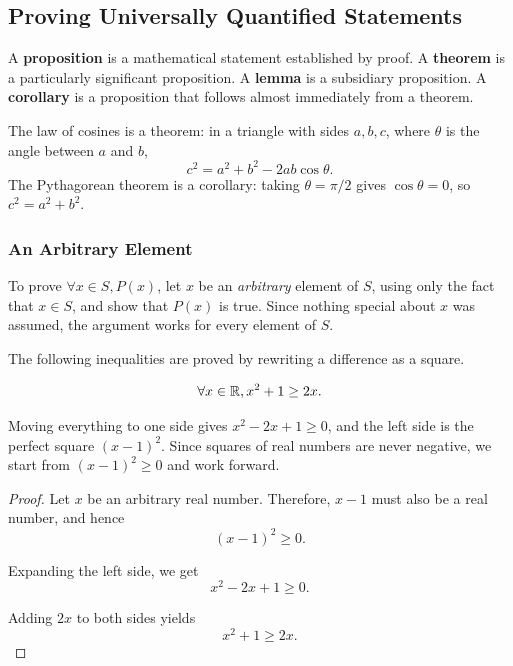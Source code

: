 \subsection{Proving Universally Quantified Statements}
A \textbf{proposition} is a mathematical statement established by proof. A \textbf{theorem}
is a particularly significant proposition. A \textbf{lemma} is a subsidiary proposition.
A \textbf{corollary} is a proposition that follows almost immediately from a theorem.

\begin{example}
    The law of cosines is a theorem: in a triangle with sides $a, b, c$, where $\theta$ is the angle between
    $a$ and $b$,
    \begin{equation*}
        c^2 = a^2 + b^2 - 2ab\cos \theta.
    \end{equation*}
    The Pythagorean theorem is a corollary: taking $\theta = \pi/2$ gives $\cos\theta = 0$, so $c^2 = a^2 + b^2$.
\end{example}

\subsubsection{An Arbitrary Element}
To prove $\forall x \in S, P(x)$, let $x$ be an \emph{arbitrary} element of $S$, using only the fact that
$x \in S$, and show that $P(x)$ is true. Since nothing special about $x$ was assumed, the argument
works for every element of $S$.

The following inequalities are proved by rewriting a difference as a square.
\begin{proposition}
    \begin{equation*}
        \forall x \in \mathbb{R}, x^2 + 1 \geq 2x.
    \end{equation*}
\end{proposition}
\begin{remark}
    Moving everything to one side gives $x^2 - 2x + 1 \geq 0$, and the left side is the perfect square
    $(x - 1)^2$. Since squares of real numbers are never negative, we start from $(x-1)^2 \geq 0$
    and work forward.
\end{remark}
\begin{proof}
    Let $x$ be an arbitrary real number. Therefore, $x - 1$ must also be a real number, and hence
    \begin{equation*}
        (x - 1)^2 \geq 0.
    \end{equation*}

    Expanding the left side, we get
    \begin{equation*}
        x^2 - 2x + 1 \geq 0.
    \end{equation*}

    Adding $2x$ to both sides yields
    \begin{equation*}
        x^2 + 1 \geq 2x.
    \end{equation*}
\end{proof}

